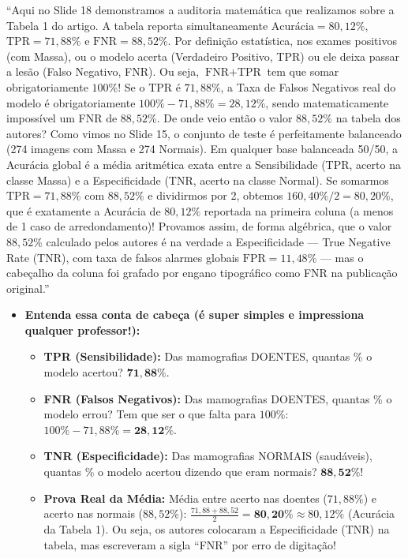 \documentclass[11pt,a4paper]{article}
\newenvironment{falabox}{%
    \begin{tcolorbox}[colback=speechbg, colframe=speechborder, boxrule=1.2pt, arc=4pt, left=10pt, right=10pt, top=8pt, bottom=8pt, title={\bfseries O QUE VOCÊ DEVE FALAR (Fala Sugerida)}]%
}{%
    \end{tcolorbox}%
}
\newenvironment{explicabox}{%
    \begin{tcolorbox}[colback=explainbg, colframe=explainborder, boxrule=0.8pt, arc=4pt, left=10pt, right=10pt, top=8pt, bottom=8pt, title={\bfseries ENTENDA O QUE VOCÊ ESTÁ FALANDO (Explicação Didática de Cada Termo)}]%
}{%
    \end{tcolorbox}%
}
\begin{document}
\begin{falabox}
``Aqui no Slide 18 demonstramos a auditoria matemática que realizamos sobre a Tabela 1 do artigo. A tabela reporta simultaneamente $\text{Acurácia} = 80{,}12\%$, $\text{TPR} = 71{,}88\%$ e $\text{FNR} = 88{,}52\%$.
Por definição estatística, nos exames positivos (com Massa), ou o modelo acerta (Verdadeiro Positivo, TPR) ou ele deixa passar a lesão (Falso Negativo, FNR). Ou seja, $\text{FNR} + \text{TPR}$ tem que somar obrigatoriamente $100\%$! Se o $\text{TPR}$ é $71{,}88\%$, a Taxa de Falsos Negativos real do modelo é obrigatoriamente $100\% - 71{,}88\% = 28{,}12\%$, sendo matematicamente impossível um FNR de $88{,}52\%$.
De onde veio então o valor $88{,}52\%$ na tabela dos autores? Como vimos no Slide 15, o conjunto de teste é perfeitamente balanceado (274 imagens com Massa e 274 Normais). Em qualquer base balanceada 50/50, a Acurácia global é a média aritmética exata entre a Sensibilidade (TPR, acerto na classe Massa) e a Especificidade (TNR, acerto na classe Normal). Se somarmos $\text{TPR} = 71{,}88\%$ com $88{,}52\%$ e dividirmos por 2, obtemos $160{,}40\% / 2 = 80{,}20\%$, que é exatamente a Acurácia de $80{,}12\%$ reportada na primeira coluna (a menos de 1 caso de arredondamento)!
Provamos assim, de forma algébrica, que o valor $88{,}52\%$ calculado pelos autores é na verdade a Especificidade — True Negative Rate (TNR), com taxa de falsos alarmes globais $\text{FPR} = 11{,}48\%$ — mas o cabeçalho da coluna foi grafado por engano tipográfico como FNR na publicação original.''
\end{falabox}

\begin{explicabox}
\begin{itemize}[leftmargin=*, itemsep=4pt]
    \item \textbf{Entenda essa conta de cabeça (é super simples e impressiona qualquer professor!):}
    \begin{itemize}
        \item \textbf{TPR (Sensibilidade):} Das mamografias DOENTES, quantas \% o modelo acertou? $\mathbf{71{,}88\%}$.
        \item \textbf{FNR (Falsos Negativos):} Das mamografias DOENTES, quantas \% o modelo errou? Tem que ser o que falta para $100\%$: $100\% - 71{,}88\% = \mathbf{28{,}12\%}$.
        \item \textbf{TNR (Especificidade):} Das mamografias NORMAIS (saudáveis), quantas \% o modelo acertou dizendo que eram normais? $\mathbf{88{,}52\%}$!
        \item \textbf{Prova Real da Média:} Média entre acerto nas doentes ($71{,}88\%$) e acerto nas normais ($88{,}52\%$): $\frac{71{,}88 + 88{,}52}{2} = \mathbf{80{,}20\%} \approx 80{,}12\%$ (Acurácia da Tabela 1). Ou seja, os autores colocaram a Especificidade (TNR) na tabela, mas escreveram a sigla ``FNR'' por erro de digitação!
    \end{itemize}
\end{itemize}
\end{explicabox}
\end{document}
